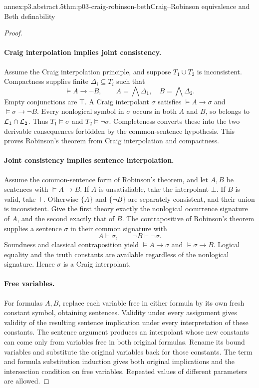 \begin{annexitem}{annex:p3.abstract.5}{thm:p03-craig-robinson-beth}{Craig--Robinson equivalence and Beth definability}
\begin{proof}
\paragraph{Craig interpolation implies joint consistency.}
Assume the Craig interpolation principle, and suppose
\(T_1\cup T_2\) is inconsistent.
Compactness supplies finite \(\Delta_i\subseteq T_i\) such that
\[
 \models A\to\neg B,\qquad
 A=\bigwedge\Delta_1,\quad B=\bigwedge\Delta_2.
\]
Empty conjunctions are \(\top\).
A Craig interpolant \(\sigma\) satisfies
\(\models A\to\sigma\) and \(\models\sigma\to\neg B\).
Every nonlogical symbol in \(\sigma\) occurs in both \(A\) and \(B\),
so belongs to \(\mathcal{L}_1\cap\mathcal{L}_2\).
Thus \(T_1\models\sigma\) and \(T_2\models\neg\sigma\).
Completeness converts these into the two derivable consequences
forbidden by the common-sentence hypothesis.
This proves Robinson's theorem from Craig interpolation and compactness.

\paragraph{Joint consistency implies sentence interpolation.}
Assume the common-sentence form of Robinson's theorem, and let
\(A,B\) be sentences with \(\models A\to B\).
If \(A\) is unsatisfiable, take the interpolant \(\bot\).
If \(B\) is valid, take \(\top\).
Otherwise \(\{A\}\) and \(\{\neg B\}\) are separately consistent,
and their union is inconsistent.
Give the first theory exactly the nonlogical occurrence signature of
\(A\), and the second exactly that of \(B\).
The contrapositive of Robinson's theorem supplies a sentence \(\sigma\)
in their common signature with
\[
 A\vdash\sigma,\qquad \neg B\vdash\neg\sigma.
\]
Soundness and classical contraposition yield
\(\models A\to\sigma\) and \(\models\sigma\to B\).
Logical equality and the truth constants are available regardless
of the nonlogical signature.  Hence \(\sigma\) is a Craig interpolant.

\paragraph{Free variables.}
For formulas \(A,B\), replace each variable free in either formula by
its own fresh constant symbol, obtaining sentences.
Validity under every assignment gives validity of the resulting
sentence implication under every interpretation of these constants.
The sentence argument produces an interpolant whose new constants
can come only from variables free in both original formulas.
Rename its bound variables and substitute the original variables
back for those constants.  The term and formula substitution induction
gives both original implications and the intersection condition on
free variables.  Repeated values of different parameters are allowed.


\end{proof}
\end{annexitem}
